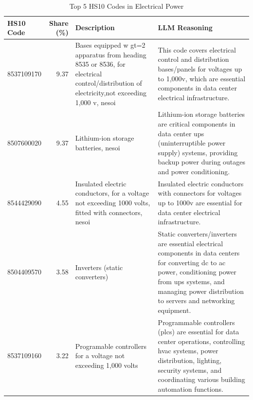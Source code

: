 \begin{table}[htbp]
\centering
\caption{Top 5 HS10 Codes in Electrical Power}
\label{tab:top5_electrical_power}
\begin{tabular}{lrp{5.5cm}p{5.5cm}}
\toprule
HS10 Code & Share (\%) & Description & LLM Reasoning \\
\midrule
8537109170 & 9.37 & {\footnotesize Bases equipped w gt=2 apparatus from heading 8535 or 8536, for electrical control/distribution of electricity,not exceeding 1,000 v, nesoi} & {\footnotesize This code covers electrical control and distribution bases/panels for voltages up to 1,000v, which are essential components in data center electrical infrastructure.} \\
8507600020 & 9.37 & {\footnotesize Lithium-ion storage batteries, nesoi} & {\footnotesize Lithium-ion storage batteries are critical components in data center ups (uninterruptible power supply) systems, providing backup power during outages and power conditioning.} \\
8544429090 & 4.55 & {\footnotesize Insulated electric conductors, for a voltage not exceeding 1000 volts, fitted with connectors, nesoi} & {\footnotesize Insulated electric conductors with connectors for voltages up to 1000v are essential for data center electrical infrastructure.} \\
8504409570 & 3.58 & {\footnotesize Inverters (static converters)} & {\footnotesize Static converters/inverters are essential electrical components in data centers for converting dc to ac power, conditioning power from ups systems, and managing power distribution to servers and networking equipment.} \\
8537109160 & 3.22 & {\footnotesize Programable controllers for a voltage not exceeding 1,000 volts} & {\footnotesize Programmable controllers (plcs) are essential for data center operations, controlling hvac systems, power distribution, lighting, security systems, and coordinating various building automation functions.} \\
\bottomrule
\end{tabular}
\end{table}
